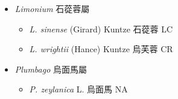 
  \begin{itemize}
 \item[] \textit{Limonium} 石蓯蓉屬
                                
  \begin{itemize}
        \item[] \textit{L. sinense} (Girard) Kuntze  石蓯蓉   LC
        \item[] \textit{L. wrightii} (Hance) Kuntze  烏芙蓉   CR
  \end{itemize}
 \item[] \textit{Plumbago} 烏面馬屬
                                
  \begin{itemize}
        \item[] \textit{P. zeylanica} L.  烏面馬   NA
  \end{itemize}
  \end{itemize}
